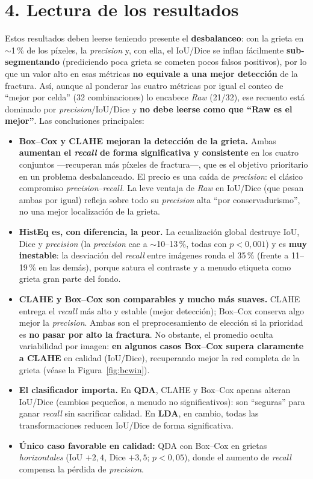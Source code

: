 \documentclass[11pt]{article}
\begin{document}
\section*{4. Lectura de los resultados}
Estos resultados deben leerse teniendo presente el \textbf{desbalanceo}: con la grieta
en $\sim$1\,\% de los p\'ixeles, la \emph{precision} y, con ella, el IoU/Dice se
inflan f\'acilmente \textbf{sub-segmentando} (prediciendo poca grieta se cometen pocos
falsos positivos), por lo que un valor alto en esas m\'etricas \textbf{no equivale a
una mejor detecci\'on} de la fractura. As\'i, aunque al ponderar las cuatro m\'etricas
por igual el conteo de ``mejor por celda'' (32 combinaciones) lo encabece \emph{Raw}
(21/32), ese recuento est\'a dominado por
\emph{precision}/IoU/Dice y \textbf{no debe leerse como que ``Raw es el mejor''}. Las
conclusiones principales:
\begin{itemize}
  \item \textbf{Box--Cox y CLAHE mejoran la detecci\'on de la grieta.} Ambas
  \textbf{aumentan el \emph{recall} de forma significativa y consistente} en los cuatro
  conjuntos ---recuperan m\'as p\'ixeles de fractura---, que es el objetivo prioritario
  en un problema desbalanceado. El precio es una ca\'ida de \emph{precision}: el
  cl\'asico compromiso \emph{precision}--\emph{recall}. La leve ventaja de \emph{Raw}
  en IoU/Dice (que pesan ambas por igual) refleja sobre todo su \emph{precision} alta
  ``por conservadurismo'', no una mejor localizaci\'on de la grieta.
  \item \textbf{HistEq es, con diferencia, la peor.} La ecualizaci\'on global
  destruye IoU, Dice y \emph{precision} (la \emph{precision} cae a $\sim$10--13\,\%,
  todas con $p<0{,}001$) y es \textbf{muy inestable}: la desviaci\'on del \emph{recall}
  entre im\'agenes ronda el 35\,\% (frente a 11--19\,\% en las dem\'as), porque satura
  el contraste y a menudo etiqueta como grieta gran parte del fondo.
  \item \textbf{CLAHE y Box--Cox son comparables y mucho m\'as suaves.} CLAHE entrega
  el \emph{recall} m\'as alto y estable (mejor detecci\'on); Box--Cox conserva algo
  mejor la \emph{precision}. Ambas son el preprocesamiento de elecci\'on si la
  prioridad es \textbf{no pasar por alto la fractura}. No obstante, el promedio oculta
  variabilidad por imagen: \textbf{en algunos casos Box--Cox supera claramente a CLAHE}
  en calidad (IoU/Dice), recuperando mejor la red completa de la grieta
  (v\'ease la Figura~\ref{fig:bcwin}).
  \item \textbf{El clasificador importa.} En \textbf{QDA}, CLAHE y Box--Cox apenas
  alteran IoU/Dice (cambios peque\~nos, a menudo no significativos): son ``seguras''
  para ganar \emph{recall} sin sacrificar calidad. En \textbf{LDA}, en cambio, todas
  las transformaciones reducen IoU/Dice de forma significativa.
  \item \textbf{\'Unico caso favorable en calidad:} QDA con Box--Cox en grietas
  \emph{horizontales} (IoU $+2{,}4$, Dice $+3{,}5$; $p<0{,}05$), donde el aumento de
  \emph{recall} compensa la p\'erdida de \emph{precision}.
\end{itemize}
\end{document}
